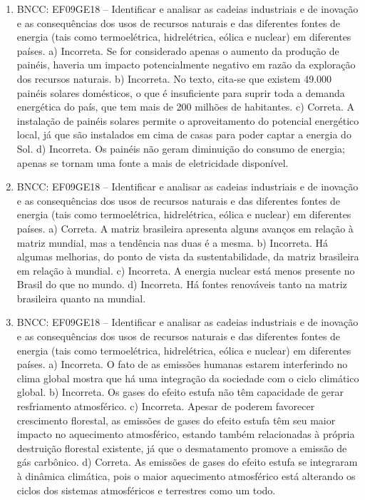 
\begin{enumerate}
\item
BNCC: EF09GE18 -- Identificar e analisar as cadeias industriais e de
inovação e as consequências dos usos de recursos naturais e das
diferentes fontes de energia (tais como termoelétrica, hidrelétrica,
eólica e nuclear) em diferentes países.
a) Incorreta. Se for considerado apenas o aumento da produção de painéis,
haveria um impacto potencialmente negativo em razão da exploração dos
recursos naturais.
b) Incorreta. No texto, cita-se que existem 49.000 painéis
solares domésticos, o que é insuficiente para suprir toda a demanda
energética do país, que tem mais de 200 milhões de habitantes.
c) Correta. A instalação de painéis solares permite o aproveitamento do
potencial energético local, já que são instalados em cima de casas para
poder captar a energia do Sol.
d) Incorreta. Os painéis não geram diminuição do consumo de energia; apenas
se tornam uma fonte a mais de eletricidade disponível.

\item
BNCC: EF09GE18 -- Identificar e analisar as cadeias industriais e de
inovação e as consequências dos usos de recursos naturais e das diferentes fontes de energia (tais
como termoelétrica, hidrelétrica, eólica e nuclear) em diferentes países.
a) Correta. A matriz brasileira apresenta alguns avanços em relação à matriz mundial, mas a tendência nas duas é a mesma.
b) Incorreta. Há algumas melhorias, do ponto de vista da sustentabilidade, da matriz brasileira em relação à mundial.
c) Incorreta. A energia nuclear está menos presente no Brasil do que no mundo.
d) Incorreta. Há fontes renováveis tanto na matriz brasileira quanto na mundial.

\item
BNCC: EF09GE18 -- Identificar e analisar as cadeias industriais e de
inovação e as consequências dos usos de recursos naturais e das diferentes fontes de energia (tais
como termoelétrica, hidrelétrica, eólica e nuclear) em diferentes países.
a) Incorreta. O fato de as emissões humanas estarem interferindo no clima
global mostra que há uma integração da sociedade com o ciclo climático
global.
b) Incorreta. Os gases do efeito estufa não têm capacidade de gerar
resfriamento atmosférico.
c) Incorreta. Apesar de poderem favorecer crescimento florestal, as
emissões de gases do efeito estufa têm seu maior impacto no aquecimento
atmosférico, estando também relacionadas à própria destruição florestal
existente, já que o desmatamento promove a emissão de gás carbônico.
d) Correta. As emissões de gases do efeito estufa se integraram à dinâmica
climática, pois o maior aquecimento atmosférico está alterando os ciclos
dos sistemas atmosféricos e terrestres como um todo.
\end{enumerate}

